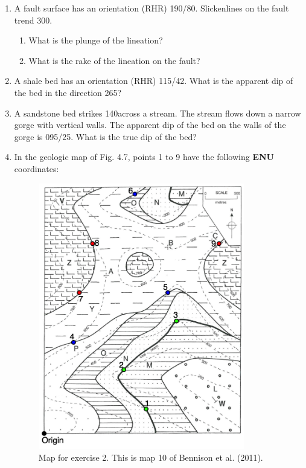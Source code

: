 \documentclass[a4paper , 12pt]{book}
\begin{document}
\begin{enumerate}
    
    \item A fault surface has an orientation (RHR) 190/80. Slickenlines on the fault trend 300\degree. 
    \begin{enumerate}
        \item What is the plunge of the lineation?
        \item What is the rake of the lineation on the fault?
    \end{enumerate}
    
    \item A shale bed has an orientation (RHR) 115/42. What is the apparent dip of the bed in the direction 265\degree?
    
    \item A sandstone bed strikes 140\degree across a stream. The stream flows down a narrow gorge with vertical walls. The apparent dip of the bed on the walls of the gorge is 095/25. What is the true dip of the bed?
    
    \item In the geologic map of Fig. 4.7, points 1 to 9 have the following \textbf{ENU} coordinates:
    
    \begin{figure}[ht]
    \centering
    \includegraphics[width=9cm]{Figures/ch4f8.png}
    \caption{Map for exercise 2. This is map 10 of Bennison et al. (2011).}
    \end{figure}
    

\end{enumerate}
\end{document}
